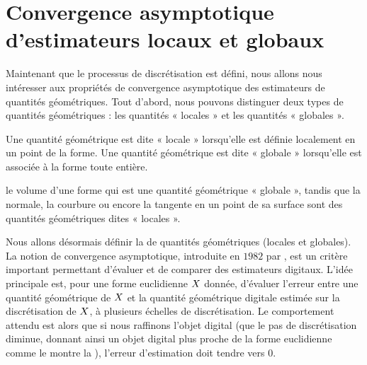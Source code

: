 \section{Convergence asymptotique d'estimateurs locaux et globaux}
\label{sec:multigrid-convergence-estimator}
%
Maintenant que le processus de discrétisation est défini, nous allons nous
intéresser aux propriétés de convergence asymptotique des estimateurs de
quantités géométriques. Tout d'abord, nous pouvons distinguer deux types de
quantités géométriques : les quantités « locales » et les quantités « globales ».
%
\begin{definition}{}
  \label{def:global-quantity}
  Une quantité géométrique est dite « locale » lorsqu'elle est définie
  localement en un point de la forme. Une quantité géométrique est dite «
  globale » lorsqu'elle est associée à la forme toute entière.
\end{definition}
%
 le volume
d'une forme qui est une quantité géométrique « globale », tandis que la normale,
la courbure ou encore la tangente en un point de sa surface sont des quantités
géométriques dites « locales ».


Nous allons désormais définir la  de quantités géométriques (locales et globales). La notion de
convergence asymptotique, introduite en $1982$ par ,
est un critère important permettant d'évaluer et de comparer des estimateurs
digitaux. L'idée principale est, pour une forme euclidienne $X$ donnée,
d'évaluer l'erreur entre une quantité géométrique de $X$ et la quantité
géométrique digitale estimée sur la discrétisation de $X$, à plusieurs
échelles de discrétisation. Le comportement attendu est alors que si nous
raffinons l'objet digital (\cad que le pas de discrétisation diminue, donnant
ainsi un objet digital plus proche de la forme euclidienne comme le montre la
), l'erreur d'estimation doit tendre vers $0$.


